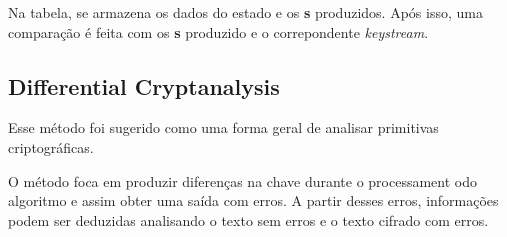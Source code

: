 Na tabela, se armazena os dados do estado e os \textbf{s} produzidos. Após isso, uma comparação é feita com os \textbf{s} produzido e o correpondente \textit{keystream}.

\subsection{Differential Cryptanalysis}
\label{differential-cryptanalysis}

Esse método foi sugerido como uma forma geral de analisar primitivas criptográficas. ~\cite{eli-orr} 

O método foca em produzir diferenças na chave durante o processament odo algoritmo e assim obter uma saída com erros. A partir desses erros, informações podem ser deduzidas analisando o texto sem erros e o texto cifrado com erros. 